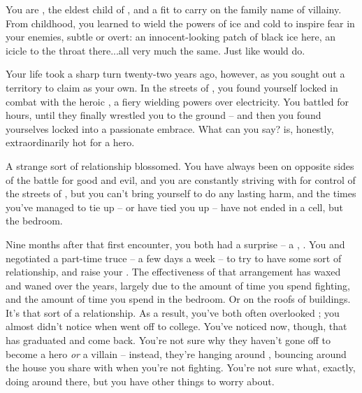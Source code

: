 \documentclass[char]{LRSguildcamp1}
\begin{document}
\name{\cOldest{}}

You are \cOldest{\intro}, the eldest child of \cGrandma{\intro}, and a \cOldest{\offspring} fit to carry on the family name of villainy.  
From childhood, you learned to wield the powers of ice and cold to inspire fear in your enemies, subtle or overt: an innocent-looking patch of black ice here, an icicle to the throat there...all very much the same.  Just like \cGrandma{\Parent} would do.


Your life took a sharp turn twenty-two years ago, however, as you sought out a territory to claim as your own.  In the streets of \pCityO{}, you found yourself locked in combat with the heroic \cOS{\intro}, a fiery \cOS{\hero} wielding powers over electricity.  You battled for hours, until they finally wrestled you to the ground -- and then you found yourselves locked into a passionate embrace.  What can you say?  \cOS{} is, honestly, extraordinarily hot for a hero.

A strange sort of relationship blossomed.  You have always been on opposite sides of the battle for good and evil, and you are constantly striving with \cOS{\them} for control of the streets of \pCityO{}, but you can't bring yourself to do \cOS{\them} any lasting harm, and the times you've managed to tie \cOS{\them} up -- or \cOS{\they} have tied you up -- have not ended in a cell, but the bedroom.

Nine months after that first encounter, you both had a surprise -- a \cGrad{\offspring}, \cGrad{\intro}.  You and \cOS{} negotiated a part-time truce -- a few days a week -- to try to have some sort of relationship, and raise your \cGrad{\offspring}.  The effectiveness of that arrangement has waxed and waned over the years, largely due to the amount of time you spend fighting, and the amount of time you spend in the bedroom.  Or on the roofs of buildings.  It's that sort of a relationship.  As a result, you've both often overlooked \cGrad{}; you almost didn't notice when \cGrad{} went off to college.  You've noticed now, though, that \cGrad{} has graduated and come back.  You're not sure why they haven't gone off to become a hero \emph{or} a villain -- instead, they're hanging around \pCityO{}, bouncing around the house you share with \cOS{} when you're not fighting.  You're not sure what, exactly, \cGrad{\theyare} doing around there, but you have other things to worry about.
\end{document}
